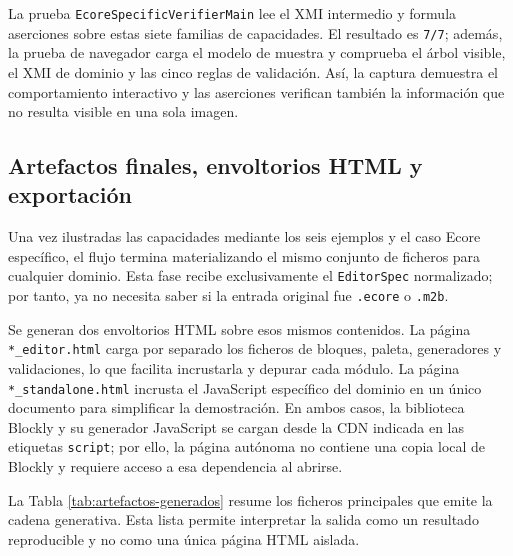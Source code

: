 La prueba \texttt{EcoreSpecificVerifierMain} lee el XMI intermedio y formula
aserciones sobre estas siete familias de capacidades. El resultado es
\texttt{7/7}; además, la prueba de navegador carga el modelo de muestra y
comprueba el árbol visible, el XMI de dominio y las cinco reglas de validación.
Así, la captura demuestra el comportamiento interactivo y las aserciones
verifican también la información que no resulta visible en una sola imagen.
\FloatBarrier

\subsection{Artefactos finales, envoltorios HTML y exportación}

Una vez ilustradas las capacidades mediante los seis ejemplos y el caso Ecore
específico, el flujo termina materializando el mismo conjunto de ficheros para
cualquier dominio. Esta fase recibe exclusivamente el \texttt{EditorSpec}
normalizado; por tanto, ya no necesita saber si la entrada original fue
\texttt{.ecore} o \texttt{.m2b}.

Se generan dos envoltorios HTML sobre esos mismos contenidos. La página
\texttt{*\_editor.}\allowbreak\texttt{html} carga por separado los ficheros de bloques, paleta,
generadores y validaciones, lo que facilita incrustarla y depurar cada módulo.
La página \texttt{*\_standalone.html} incrusta el JavaScript específico del
dominio en un único documento para simplificar la demostración. En ambos casos,
la biblioteca Blockly y su generador JavaScript se cargan desde la CDN indicada
en las etiquetas \texttt{script}; por ello, la página autónoma no contiene una
copia local de Blockly y requiere acceso a esa dependencia al abrirse.

La Tabla \ref{tab:artefactos-generados} resume los ficheros principales que
emite la cadena generativa. Esta lista permite interpretar la salida como un
resultado reproducible y no como una única página HTML aislada.

